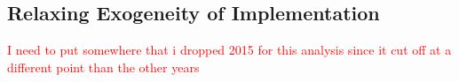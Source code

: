 \documentclass[11pt]{article}
\begin{document}
\begin{figure}[ht]
\begin{minipage}[b]{0.47\linewidth}
        \end{minipage}
\end{figure}

\subsection{Relaxing Exogeneity of Implementation}


\textcolor{red}{I need to put somewhere that i dropped 2015 for this analysis since it cut off at a different point than the other years}

\renewcommand*{\bibfont}{\footnotesize}

\printbibliography

\newpage

\appendix

\section{}
\end{document}
